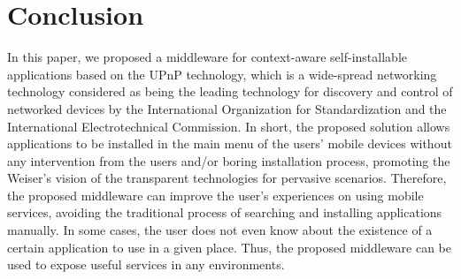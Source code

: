 \documentclass[journal]{IEEEtran}
\begin{document}
\section{Conclusion}
In this paper, we proposed a middleware for context-aware self-installable applications based on the UPnP technology, which is a wide-spread networking technology considered as being the leading technology for discovery and control of networked devices \cite{sherwin2009upnp} by the International Organization for Standardization and the International Electrotechnical Commission. In short, the proposed solution allows applications to be  installed in the main menu of the users' mobile devices without any intervention from the users and/or boring installation process, promoting the Weiser's vision of the transparent technologies for pervasive scenarios. Therefore, the proposed middleware can improve the user's experiences on using mobile services, avoiding the traditional process of searching and installing applications manually. In some cases, the user does not even know about the existence of a certain application to use in a given place. Thus, the proposed middleware can be used to expose useful services in any environments.

\ifCLASSOPTIONcaptionsoff
  \newpage
\fi 

{}

\end{document}

